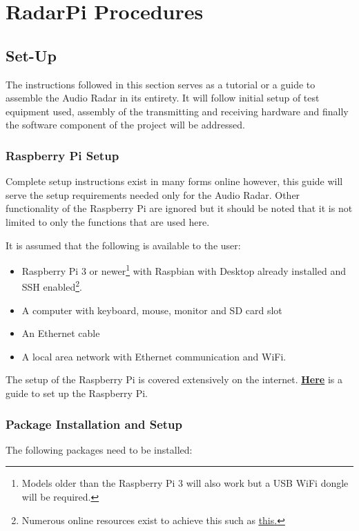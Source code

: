 \appendix \chapter{RadarPi Procedures}\label{chap:Tutorial}

\section{Set-Up}\label{Appendix:Tutorial}

The instructions followed in this section serves as a tutorial or a guide to assemble the Audio Radar in its entirety. It will follow initial setup of test equipment used, assembly of the transmitting and receiving hardware and finally the software component of the project will be addressed.

\subsection{Raspberry Pi Setup}

Complete setup instructions exist in many forms online however, this guide will serve the setup requirements needed only for the Audio Radar. Other functionality of the Raspberry Pi are ignored but it should be noted that it is not limited to only the functions that are used here. 

It is assumed that the following is available to the user:

\begin{itemize}
    \item Raspberry Pi 3 or newer\footnote{Models older than the Raspberry Pi 3 will also work but a USB WiFi dongle will be required.} with Raspbian with Desktop already installed and SSH enabled\footnote{Numerous online resources exist to achieve this such as \href{https://hackernoon.com/raspberry-pi-headless-install-462ccabd75d0}{\underline{this}.}}.
    \item A computer with keyboard, mouse, monitor and SD card slot
    \item An Ethernet cable
    \item A local area network with Ethernet communication and WiFi.
\end{itemize}

The setup of the Raspberry Pi is covered extensively on the internet. \href{https://www.instructables.com/id/Ultimate-Raspberry-Pi-Configuration-Guide/}{\textbf{Here}} is a guide to set up the Raspberry Pi.

\subsection{Package Installation and Setup}
The following packages need to be installed:

